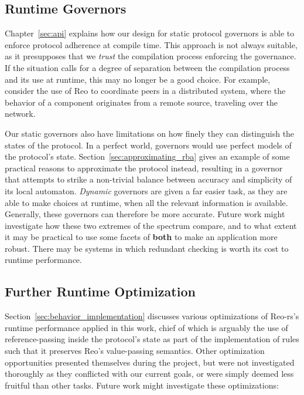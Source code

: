 \subsection{Runtime Governors}
Chapter~\ref{sec:api} explains how our design for static protocol governors is able to enforce protocol adherence at compile time. This approach is not always suitable, as it presupposes that we \textit{trust} the compilation process enforcing the governance. If the situation calls for a degree of separation between the compilation process and its use at runtime, this may no longer be a good choice. For example, consider the use of Reo to coordinate peers in a distributed system, where the behavior of a component originates from a remote source, traveling over the network.

Our static governors also have limitations on how finely they can distinguish the states of the protocol. In a perfect world, governors would use perfect models of the protocol's state. Section~\ref{sec:approximating_rba} gives an example of some practical reasons to approximate the protocol instead, resulting in a governor that attempts to strike a non-trivial balance between accuracy and simplicity of its local automaton. \textit{Dynamic} governors are given a far easier task, as they are able to make choices at runtime, when all the relevant information is available. Generally, these governors can therefore be more accurate. Future work might investigate how these two extremes of the spectrum compare, and to what extent it may be practical to use some facets of \textbf{both} to make an application more robust. There may be systems in which redundant checking is worth its cost to runtime performance.

\subsection{Further Runtime Optimization}
Section~\ref{sec:behavior_implementation} discusses various optimizations of Reo-rs's runtime performance applied in this work, chief of which is arguably the use of reference-passing inside the protocol's state as part of the implementation of rules such that it preserves Reo's value-passing semantics. Other optimization opportunities presented themselves during the project, but were not investigated thoroughly as they conflicted with our current goals, or were simply deemed less fruitful than other tasks. Future work might investigate these optimizations:

